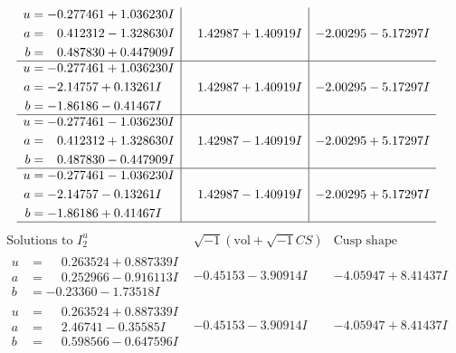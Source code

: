 \documentclass[1p]{elsarticle_modified}
\theoremstyle{definition}
\newcommand{\I}{\sqrt{-1}}
\begin{document}
$$\begin{array}{c|c|c}
\begin{aligned}
u &= -0.277461 + 1.036230 I \\
a &= \phantom{-}0.412312 - 1.328630 I \\
b &= \phantom{-}0.487830 + 0.447909 I\end{aligned}
 & \phantom{-}1.42987 + 1.40919 I & -2.00295 - 5.17297 I \\ \hline\begin{aligned}
u &= -0.277461 + 1.036230 I \\
a &= -2.14757 + 0.13261 I \\
b &= -1.86186 - 0.41467 I\end{aligned}
 & \phantom{-}1.42987 + 1.40919 I & -2.00295 - 5.17297 I \\ \hline\begin{aligned}
u &= -0.277461 - 1.036230 I \\
a &= \phantom{-}0.412312 + 1.328630 I \\
b &= \phantom{-}0.487830 - 0.447909 I\end{aligned}
 & \phantom{-}1.42987 - 1.40919 I & -2.00295 + 5.17297 I \\ \hline\begin{aligned}
u &= -0.277461 - 1.036230 I \\
a &= -2.14757 - 0.13261 I \\
b &= -1.86186 + 0.41467 I\end{aligned}
 & \phantom{-}1.42987 - 1.40919 I & -2.00295 + 5.17297 I\\
 \hline 
 \end{array}$$\newpage$$\begin{array}{c|c|c}  
\text{Solutions to }I^u_{2}& \I (\text{vol} + \sqrt{-1}CS) & \text{Cusp shape}\\
 \hline 
\begin{aligned}
u &= \phantom{-}0.263524 + 0.887339 I \\
a &= \phantom{-}0.252966 - 0.916113 I \\
b &= -0.23360 - 1.73518 I\end{aligned}
 & -0.45153 - 3.90914 I & -4.05947 + 8.41437 I \\ \hline\begin{aligned}
u &= \phantom{-}0.263524 + 0.887339 I \\
a &= \phantom{-}2.46741 - 0.35585 I \\
b &= \phantom{-}0.598566 - 0.647596 I\end{aligned}
 & -0.45153 - 3.90914 I & -4.05947 + 8.41437 I \\ \hline\begin{aligned}

\end{aligned}
\end{array}$$
\end{document}
